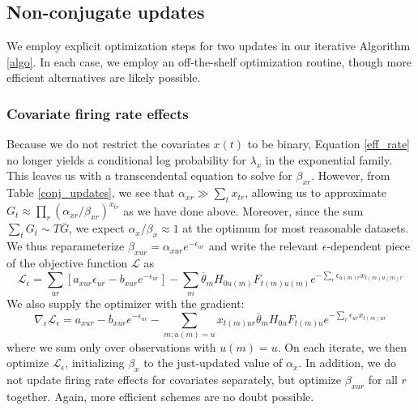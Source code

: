 \documentclass[12pt,a4paper]{article}
\begin{document}
\begin{flushleft}
\subsection{Non-conjugate updates}
\label{non-conj}
We employ explicit optimization steps for two updates in our iterative Algorithm \ref{algo}. In each case, we employ an off-the-shelf optimization routine, though more efficient alternatives are likely possible.

\subsubsection{Covariate firing rate effects}
\label{beta_x}
Because we do not restrict the covariates $x(t)$ to be binary, Equation \ref{eff_rate} no longer yields a conditional log probability for $\lambda_x$ in the exponential family. This leaves us with a transcendental equation to solve for $\beta_{xr}$. However, from Table \ref{conj_updates}, we see that $\alpha_{xr} \gg \sum_t x_{tr}$, allowing us to approximate $G_t \approx \prod_r (\alpha_{xr}/\beta_{xr})^{x_{tr}}$ as we have done above. Moreover, since the sum $\sum_t G_t \sim T\overline{G}$, we expect $\alpha_x / \beta_x \approx 1$ at the optimum for most reasonable datasets. We thus reparameterize $\beta_{xur} = \alpha_{xur}e^{-\epsilon_{ur}}$ and write the relevant $\epsilon$-dependent piece of the objective function $\mathcal{L}$ as
\begin{equation}
    \mathcal{L}_\epsilon = \sum_{ur} \left[a_{xur}\epsilon_{ur} - b_{xur}e^{-\epsilon_{ur}} \right] - \sum_m \overline{\theta}_m H_{0u(m)} F_{t(m)u(m)}
    e^{-\sum_r \epsilon_{u(m)r} x_{t(m)u(m)r}}
\end{equation}
We also supply the optimizer with the gradient:
\begin{equation}
    \nabla_\epsilon \mathcal{L}_\epsilon = a_{xur} - b_{xur}e^{-\epsilon_{ur}}  - \sum_{m; u(m) = u} x_{t(m)ur} \overline{\theta}_m H_{0u} F_{t(m)u}
    e^{-\sum_r \epsilon_{ur} x_{t(m)ur}}
\end{equation}
where we sum only over observations with $u(m) = u$. On each iterate, we then optimize $\mathcal{L}_\epsilon$, initializing $\beta_x$ to the just-updated value of $\alpha_x$. In addition, we do not update firing rate effects for covariates separately, but optimize $\beta_{xur}$ for all $r$ together. Again, more efficient schemes are no doubt possible.


\end{flushleft}
\end{document}
